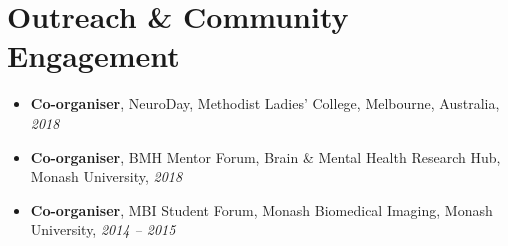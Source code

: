 \documentclass[letterpaper,10pt]{article}
\newcommand{\resumeSubHeadingListStart}{\begin{itemize}[leftmargin=*]}
\newcommand{\resumeSubHeadingListEnd}{\end{itemize}}
\begin{document}
\section{Outreach \& Community Engagement}
  \resumeSubHeadingListStart
    \item[] \textbf{Co-organiser}, NeuroDay, Methodist Ladies’ College, Melbourne, Australia, \textit{2018}
    \item[] \textbf{Co-organiser}, BMH Mentor Forum, Brain \& Mental Health Research Hub, Monash University, \textit{2018}
    \item[] \textbf{Co-organiser}, MBI Student Forum, Monash Biomedical Imaging, Monash University, \textit{2014 -- 2015}
  \resumeSubHeadingListEnd

\end{document}
